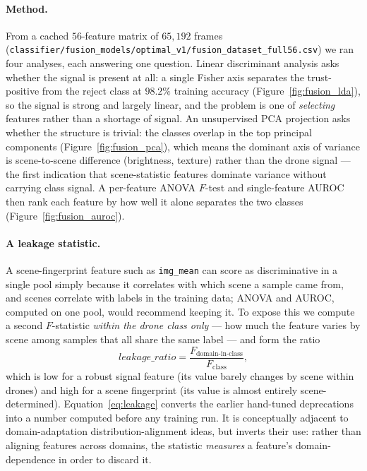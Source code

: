 \documentclass[12pt,a4paper,oneside,openright]{book}
\begin{document}
\paragraph{Method.}
From a cached $56$-feature matrix of $65{,}192$ frames (\texttt{classifier/fusion\_models/optimal\_v1/fusion\_dataset\_full56.csv}) we ran four analyses, each answering one question. Linear discriminant analysis asks whether the signal is present at all: a single Fisher axis separates the trust-positive from the reject class at $98.2\%$ training accuracy (Figure~\ref{fig:fusion_lda}), so the signal is strong and largely linear, and the problem is one of \emph{selecting} features rather than a shortage of signal. An unsupervised PCA projection asks whether the structure is trivial: the classes overlap in the top principal components (Figure~\ref{fig:fusion_pca}), which means the dominant axis of variance is scene-to-scene difference (brightness, texture) rather than the drone signal --- the first indication that scene-statistic features dominate variance without carrying class signal. A per-feature ANOVA $F$-test and single-feature AUROC then rank each feature by how well it alone separates the two classes (Figure~\ref{fig:fusion_auroc}).

\paragraph{A leakage statistic.}
A scene-fingerprint feature such as \texttt{img\_mean} can score as discriminative in a single pool simply because it correlates with which scene a sample came from, and scenes correlate with labels in the training data; ANOVA and AUROC, computed on one pool, would recommend keeping it. To expose this we compute a second $F$-statistic \emph{within the drone class only} --- how much the feature varies by scene among samples that all share the same label --- and form the ratio
\begin{equation}
\mathit{leakage\_ratio} = \frac{F_\text{domain-in-class}}{F_\text{class}},
\label{eq:leakage}
\end{equation}
which is low for a robust signal feature (its value barely changes by scene within drones) and high for a scene fingerprint (its value is almost entirely scene-determined). Equation~\ref{eq:leakage} converts the earlier hand-tuned deprecations into a number computed before any training run. It is conceptually adjacent to domain-adaptation distribution-alignment ideas, but inverts their use: rather than aligning features across domains, the statistic \emph{measures} a feature's domain-dependence in order to discard it.
\end{document}
